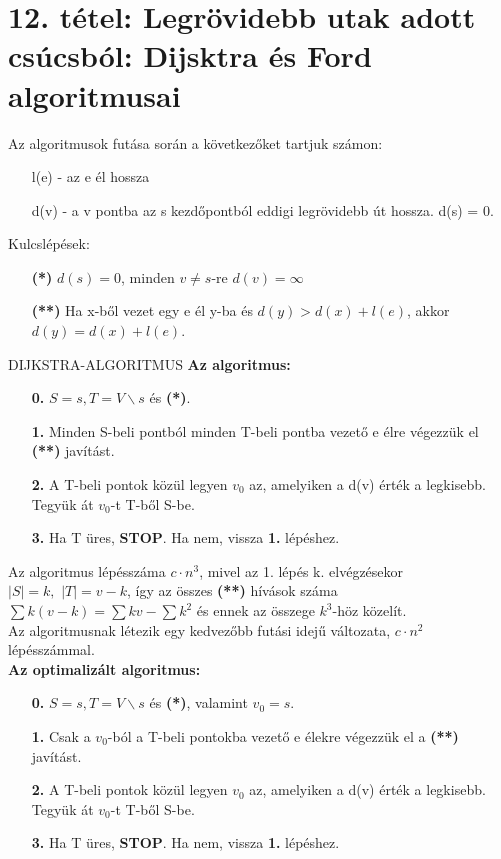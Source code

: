 \section{12. tétel: Legrövidebb utak adott csúcsból: Dijsktra és Ford algoritmusai}

Az algoritmusok futása során a következőket tartjuk számon:

\begin{itemize}
\item[] l(e) - az e él hossza
\item[] d(v) - a v pontba az s kezdőpontból eddigi legrövidebb út hossza. d(s) = 0.
\end{itemize}
Kulcslépések:
\begin{itemize}
\item[\textbf{(*)}]$d(s) = 0$, minden $v \neq s$-re $d(v) = \infty$
\item[\textbf{(**)}]Ha x-ből vezet egy e él y-ba és $d(y) > d(x) + l(e)$, akkor $d(y) = d(x) + l(e)$.
\end{itemize}

\begin{tetel}{DIJKSTRA-ALGORITMUS}
\textbf{Az algoritmus:}
\begin{itemize}
\item[\textbf{0.}] $S = {s}, T = V\backslash {s}$ és \textbf{(*)}.
\item[\textbf{1.}] Minden S-beli pontból minden T-beli pontba vezető e élre végezzük el \textbf{(**)} javítást.
\item[\textbf{2.}] A T-beli pontok közül legyen $v_0$ az, amelyiken a d(v) érték a legkisebb. Tegyük át $v_0$-t T-ből S-be.
\item[\textbf{3.}] Ha T üres, \textbf{STOP}. Ha nem, vissza \textbf{1.} lépéshez.
\end{itemize}
Az algoritmus lépésszáma $c\cdot n^3$, mivel az 1. lépés k. elvégzésekor $|S| = k,\,\, |T| = v - k$, így az összes \textbf{(**)} hívások száma $\sum k(v-k) = \sum kv - \sum k^2$ és ennek az összege $k^3$-höz közelít.\\Az algoritmusnak létezik egy kedvezőbb futási idejű változata, $c\cdot n^2$ lépésszámmal.\\
\textbf{Az optimalizált algoritmus:}
\begin{itemize}
\item[\textbf{0.}] $S = {s}, T = V\backslash {s}$ és \textbf{(*)}, valamint $v_0 = s$.
\item[\textbf{1.}] Csak a $v_0$-ból a T-beli pontokba vezető e élekre végezzük el a \textbf{(**)} javítást.
\item[\textbf{2.}] A T-beli pontok közül legyen $v_0$ az, amelyiken a d(v) érték a legkisebb. Tegyük át $v_0$-t T-ből S-be.
\item[\textbf{3.}] Ha T üres, \textbf{STOP}. Ha nem, vissza \textbf{1.} lépéshez.
\end{itemize}
\end{tetel}


